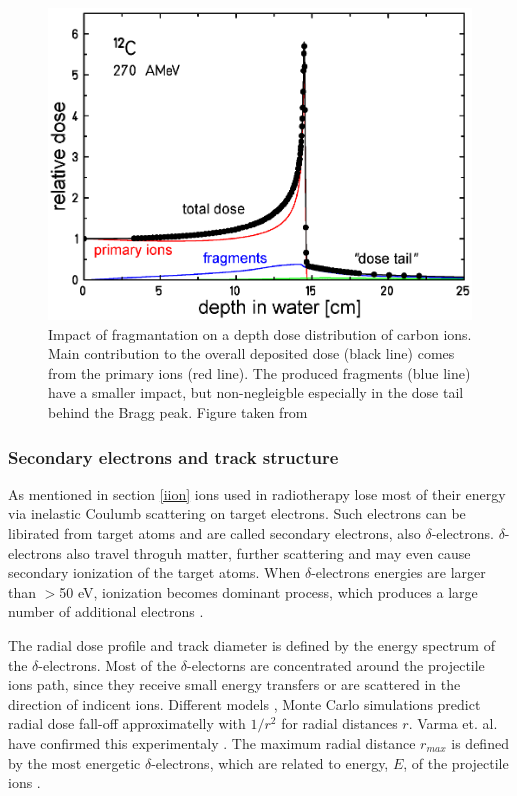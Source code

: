 \documentclass[type=dr, dr=rernat, accentcolor=tud7b,colorbacktitle, bigchapter, openright, twoside, 12pt ]{tudthesis}
\begin{document}
\begin{figure}[H]
\begin{center}
\includegraphics[scale=0.3]{./Images/iondepthdosesum.png}
\caption{Impact of fragmantation on a depth dose distribution of carbon ions. Main contribution to the overall deposited dose (black line) comes from the primary ions (red line). The produced fragments 
(blue line) have a smaller impact, but non-negleigble especially in the dose tail behind the Bragg peak. Figure taken from \cite{Groezinger2004}}
\label{iondd}
\end{center}
\end{figure}

\subsubsection{Secondary electrons and track structure}

As mentioned in section \ref{iion} ions used in radiotherapy lose most of their energy via inelastic Coulumb scattering on target electrons. Such electrons can be libirated from target atoms and are called
secondary electrons, also $\delta$-electrons. $\delta$-electrons also travel throguh matter, further scattering and may even cause secondary ionization of the target atoms. When $\delta$-electrons energies are larger than $>$50 eV,
ionization becomes dominant process, which produces a large number of additional electrons \cite{Kraft2000,Schardt2010}.

The radial dose profile and track diameter is defined by the energy spectrum of the $\delta$-electrons. Most of the $\delta$-electorns are concentrated around the projectile ions path, since they receive small energy transfers 
or are scattered in the direction of indicent ions. Different models \cite{!!}, Monte Carlo simulations \cite{!!} predict radial dose fall-off approximatelly with $1/r^2$ for radial distances $r$. Varma et. al. have confirmed 
this experimentaly \cite{Varma1977}. The maximum radial distance $r_{max}$ is defined by the most energetic $\delta$-electrons, which are related to energy, $E$, of the projectile ions \cite{Kiefer1986}.
\end{document}
